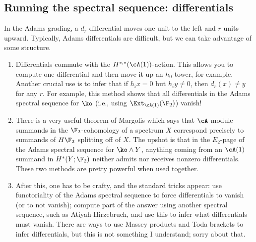 \subsection{Running the spectral sequence: differentials}
In the Adams grading, a $d_r$ differential moves one unit to the left and $r$ units upward. Typically, Adams
differentials are difficult, but we can take advantage of some structure.
\begin{enumerate}
	\item Differentials commute with the $H^{*,*}(\cA(1))$-action. This allows you to compute one differential and
	then move it up an $h_0$-tower, for example. Another crucial use is to infer that if $h_ix = 0$ but $h_iy\ne
	0$, then $d_r(x)\ne y$ for any $r$. For example, this method shows that all differentials in the Adams spectral
	sequence for $\ko$ (i.e., using $\Ext_{\cA(1)}(\F_2)$) vanish!
	\item There is a very useful theorem of Margolis which says that $\cA$-module summands in the $\F_2$-cohomology
	of a spectrum $X$ correspond precisely to summands of $H\F_2$ splitting off of $X$. The upshot is that in the
	$E_2$-page of the Adams spectral sequence for $\ko\wedge Y$, anything coming from an $\cA(1)$ summand in
	$H^*(Y;\F_2)$ neither admits nor receives nonzero differentials. These two methods are pretty powerful when
	used together.
	\item After this, one has to be crafty, and the standard tricks appear: use functoriality of the Adams spectral
	sequence to force differentials to vanish (or to not vanish); compute part of the answer using another spectral
	sequence, such as Atiyah-Hirzebruch, and use this to infer what differentials must vanish. There are ways to
	use Massey products and Toda brackets to infer differentials, but this is not something I understand; sorry
	about that.
\end{enumerate}

